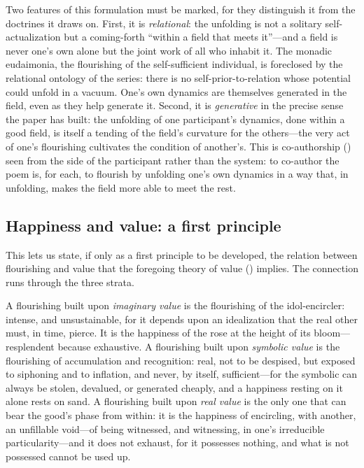 Two features of this formulation must be marked, for they distinguish it from the doctrines it draws on. First, it is \emph{relational}: the unfolding is not a solitary self-actualization but a coming-forth ``within a field that meets it''---and a field is never one's own alone but the joint work of all who inhabit it. The monadic eudaimonia, the flourishing of the self-sufficient individual, is foreclosed by the relational ontology of the series: there is no self-prior-to-relation whose potential could unfold in a vacuum. One's own dynamics are themselves generated in the field, even as they help generate it. Second, it is \emph{generative} in the precise sense the paper has built: the unfolding of one participant's dynamics, done within a good field, is itself a tending of the field's curvature for the others---the very act of one's flourishing cultivates the condition of another's. This is co-authorship () seen from the side of the participant rather than the system: to co-author the poem is, for each, to flourish by unfolding one's own dynamics in a way that, in unfolding, makes the field more able to meet the rest.

\subsection{Happiness and value: a first principle}
\label{p09:sec:happiness-value}

This lets us state, if only as a first principle to be developed, the relation between flourishing and value that the foregoing theory of value () implies. The connection runs through the three strata.

A flourishing built upon \emph{imaginary value} is the flourishing of the idol-encircler: intense, and unsustainable, for it depends upon an idealization that the real other must, in time, pierce. It is the happiness of the rose at the height of its bloom---resplendent because exhaustive. A flourishing built upon \emph{symbolic value} is the flourishing of accumulation and recognition: real, not to be despised, but exposed to siphoning and to inflation, and never, by itself, sufficient---for the symbolic can always be stolen, devalued, or generated cheaply, and a happiness resting on it alone rests on sand. A flourishing built upon \emph{real value} is the only one that can bear the good's phase from within: it is the happiness of encircling, with another, an unfillable void---of being witnessed, and witnessing, in one's irreducible particularity---and it does not exhaust, for it possesses nothing, and what is not possessed cannot be used up.

